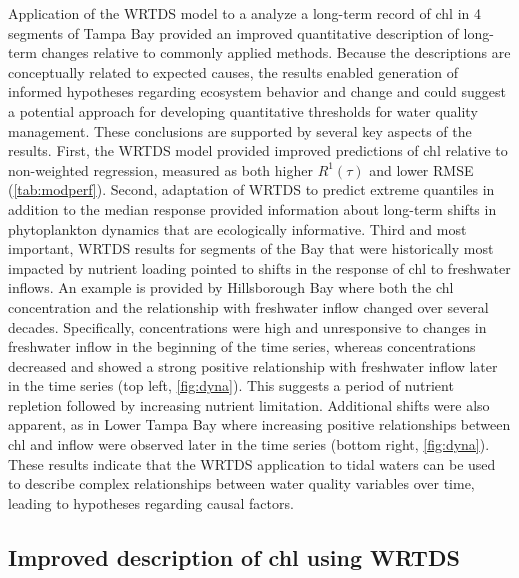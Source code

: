 \documentclass{svjour3}\usepackage[]{graphicx}\usepackage[]{color}
\begin{document}
Application of the \acf{WRTDS} model to a analyze a long-term record of \ac{chl} in 4 segments of Tampa Bay provided an improved quantitative description of long-term changes relative to commonly applied methods.  Because the descriptions are conceptually related to expected causes, the results enabled generation of informed hypotheses regarding ecosystem behavior and change and could suggest a potential approach for developing quantitative thresholds for water quality management.   These conclusions are supported by several key aspects of the results.  First, the \ac{WRTDS} model provided improved predictions of \ac{chl} relative to non-weighted regression, measured as both higher $R^1\left(\tau\right)$ and lower \ac{RMSE} (\cref{tab:modperf}).  Second, adaptation of \ac{WRTDS} to predict extreme quantiles in addition to the median response provided information about long-term shifts in phytoplankton dynamics that are ecologically informative.  Third and most important, \ac{WRTDS} results for segments of the Bay that were historically most impacted by nutrient loading pointed to shifts in the response of \ac{chl} to freshwater inflows.  An example is provided by Hillsborough Bay where both the \ac{chl} concentration and the relationship with freshwater inflow changed over several decades.  Specifically, concentrations were high and unresponsive to changes in freshwater inflow in the beginning of the time series, whereas concentrations decreased and showed a strong positive relationship with freshwater inflow later in the time series (top left, \cref{fig:dyna}).  This suggests a period of nutrient repletion followed by increasing nutrient limitation.  Additional shifts were also apparent, as in Lower Tampa Bay where increasing positive relationships between \ac{chl} and inflow were observed later in the time series (bottom right, \cref{fig:dyna}). These results indicate that the \ac{WRTDS} application to tidal waters can be used to describe complex relationships between water quality variables over time, leading to hypotheses regarding causal factors.

\subsection{Improved description of \ac{chl} using \ac{WRTDS}}
\end{document}
